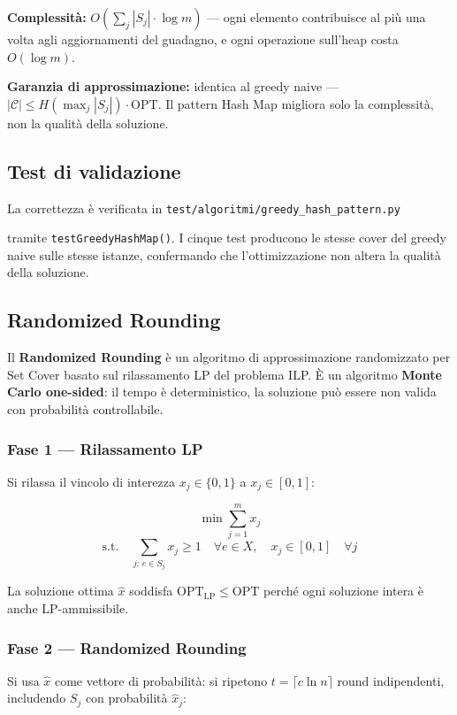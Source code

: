 \documentclass[12pt, a4paper]{article}
\begin{document}
\textbf{Complessità:} $O\!\left(\sum_j |S_j| \cdot \log m\right)$ — 
ogni elemento contribuisce al più una volta agli aggiornamenti del guadagno, 
e ogni operazione sull'heap costa $O(\log m)$.

\textbf{Garanzia di approssimazione:} identica al greedy naive — 
$|\mathcal{C}| \leq H(\max_j|S_j|) \cdot \mathrm{OPT}$. 
Il pattern Hash Map migliora solo la complessità, non la qualità della soluzione.

\subsection*{Test di validazione}

La correttezza è verificata in \texttt{test/algoritmi/greedy\_hash\_pattern.py}

tramite \texttt{testGreedyHashMap()}. I cinque test producono le stesse cover 
del greedy naive sulle stesse istanze, confermando che l'ottimizzazione 
non altera la qualità della soluzione.


\subsection{Randomized Rounding}

Il \textbf{Randomized Rounding} è un algoritmo di approssimazione randomizzato 
per Set Cover basato sul rilassamento LP del problema ILP. 
È un algoritmo \textbf{Monte Carlo one-sided}: il tempo è deterministico, 
la soluzione può essere non valida con probabilità controllabile.

\subsubsection*{Fase 1 — Rilassamento LP}

Si rilassa il vincolo di interezza $x_j \in \{0,1\}$ a $x_j \in [0,1]$:

$$\min \sum_{j=1}^{m} x_j$$
$$\text{s.t.} \quad \sum_{j:\, e \in S_j} x_j \geq 1 \quad \forall e \in X, 
\quad x_j \in [0,1] \quad \forall j$$

La soluzione ottima $\hat{x}$ soddisfa $\mathrm{OPT}_{\mathrm{LP}} \leq \mathrm{OPT}$ 
perché ogni soluzione intera è anche LP-ammissibile.

\subsubsection*{Fase 2 — Randomized Rounding}

Si usa $\hat{x}$ come vettore di probabilità: si ripetono $t = \lceil c \ln n \rceil$ 
round indipendenti, includendo $S_j$ con probabilità $\hat{x}_j$:
\end{document}
